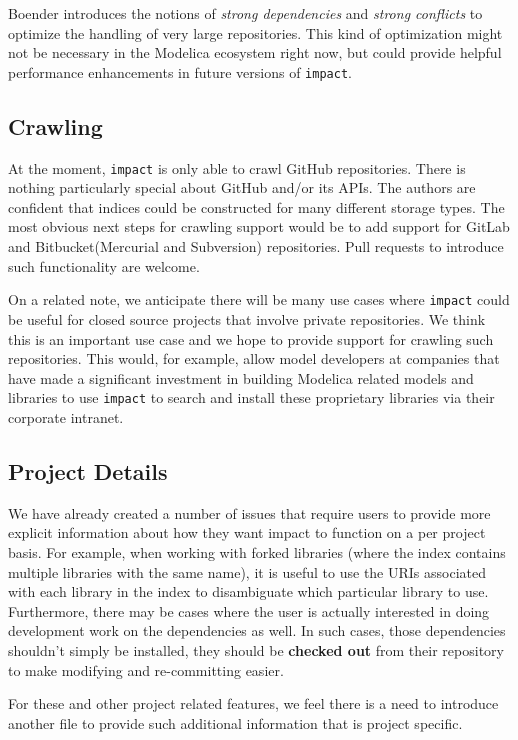 \documentclass[11pt,a4paper,twocolumn]{article}
\newcommand{\code}[1]{\texttt{#1}} %
\begin{document}
Boender introduces the notions of \emph{strong dependencies} and
\emph{strong conflicts} to optimize the handling of very large
repositories.  This kind of optimization might not be necessary in
the Modelica ecosystem right now, but could provide helpful
performance enhancements in future versions of \code{impact}.

\subsection{Crawling}

At the moment, \code{impact} is only able to crawl GitHub
repositories.  There is nothing particularly special about GitHub
and/or its APIs.  The authors are confident that indices could be
constructed for many different storage types.  The most obvious next
steps for crawling support would be to add support for GitLab and
Bitbucket(Mercurial and Subversion) repositories.  Pull requests to
introduce such functionality are welcome.

On a related note, we anticipate there will be many use cases where
\code{impact} could be useful for closed source projects that involve
private repositories.  We think this is an important use case and we
hope to provide support for crawling such repositories.  This would,
for example, allow model developers at companies that have made a
significant investment in building Modelica related models and
libraries to use \code{impact} to search and install these proprietary
libraries via their corporate intranet.

\subsection{Project Details}

We have already created a number of issues that require users to
provide more explicit information about how they want impact to
function on a per project basis.  For example, when working with
forked libraries (where the index contains multiple libraries with the
same name), it is useful to use the URIs associated with each library
in the index to disambiguate which particular library to use.
Furthermore, there may be cases where the user is actually interested
in doing development work on the dependencies as well.  In such cases,
those dependencies shouldn't simply be installed, they should be
\textbf{checked out} from their repository to make modifying and
re-committing easier.

For these and other project related features, we feel there is a need
to introduce another file to provide such additional information that
is project specific.
\end{document}
